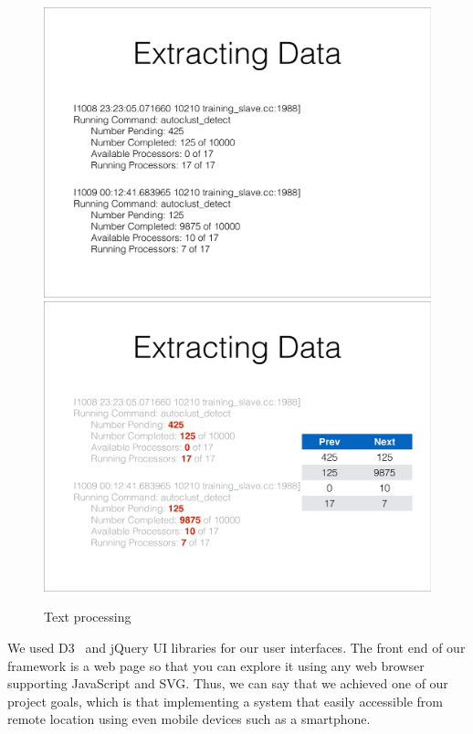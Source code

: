 \documentclass[conference]{acmsiggraph}
\begin{document}
\begin{figure}[p]
    \centering
    \includegraphics[width=1.0\columnwidth]{images/extracting_data_1.pdf}
    \includegraphics[width=1.0\columnwidth]{images/extracting_data_2.pdf}
    \caption{Text processing}
    \label{fig:extracting_data}
\end{figure}

We used D3~\cite{D311} and jQuery UI libraries for our user interfaces. The front end of our
framework is a web page so that you can explore it using any web browser supporting JavaScript and
SVG. Thus, we can say that we achieved one of our project goals, which is that implementing a system
that easily accessible from remote location using even mobile devices such as a smartphone.
\end{document}
